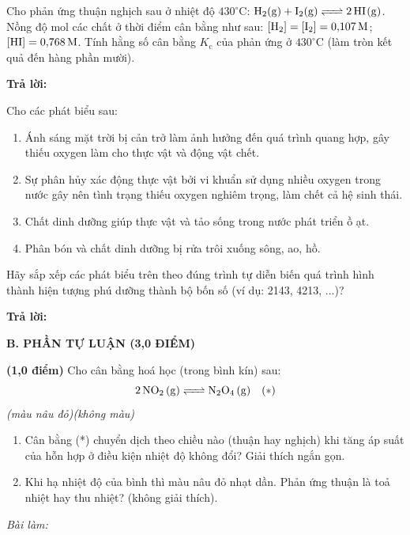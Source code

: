 \documentclass[11pt,a4paper]{article}
\begin{document}
\begin{ex}%
Cho phản ứng thuận nghịch sau ở nhiệt độ $430^\circ\text{C}$: $\ce{H2(g) + I2(g) <=> 2HI(g)}$. Nồng độ mol các chất ở thời điểm cân bằng như sau: $[\ce{H2}] = [\ce{I2}] = 0{,}107\,\text{M}$; $[\ce{HI}] = 0{,}768\,\text{M}$. Tính hằng số cân bằng $K_\text{c}$ của phản ứng ở $430^\circ\text{C}$ (làm tròn kết quả đến hàng phần mười).

\textbf{Trả lời: } \dotfill

\end{ex}


\begin{ex}%
Cho các phát biểu sau:
\begin{enumerate}[label=(\arabic*)]
\item Ánh sáng mặt trời bị cản trở làm ảnh hưởng đến quá trình quang hợp, gây thiếu oxygen làm cho thực vật và động vật chết.
\item Sự phân hủy xác động thực vật bởi vi khuẩn sử dụng nhiều oxygen trong nước gây nên tình trạng thiếu oxygen nghiêm trọng, làm chết cả hệ sinh thái.
\item Chất dinh dưỡng giúp thực vật và tảo sống trong nước phát triển ồ ạt.
\item Phân bón và chất dinh dưỡng bị rửa trôi xuống sông, ao, hồ.
\end{enumerate}
Hãy sắp xếp các phát biểu trên theo đúng trình tự diễn biến quá trình hình thành hiện tượng phú dưỡng thành bộ bốn số (ví dụ: 2143, 4213, ...)?

\textbf{Trả lời: } \dotfill

\end{ex}


\vspace{6pt}
\noindent
\textbf{\large\color{hfRed}B. PHẦN TỰ LUẬN (3,0 ĐIỂM)}
\vspace{4pt}


\begin{ex}%
\textbf{(1,0 điểm)} Cho cân bằng hoá học (trong bình kín) sau:
$$\ce{2NO2 (g) <=> N2O4 (g)}\quad (*)$$
\quad\quad\quad\quad\textit{(màu nâu đỏ)}\quad\quad\quad\textit{(không màu)}
\begin{enumerate}[label=\textbf{\alph*)}]
\item Cân bằng (*) chuyển dịch theo chiều nào (thuận hay nghịch) khi tăng áp suất của hỗn hợp ở điều kiện nhiệt độ không đổi? Giải thích ngắn gọn.
\item Khi hạ nhiệt độ của bình thì màu nâu đỏ nhạt dần. Phản ứng thuận là toả nhiệt hay thu nhiệt? (không giải thích).
\end{enumerate}

\noindent\textit{Bài làm:}

\end{ex}
\end{document}
